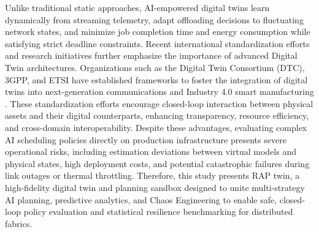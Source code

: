 \documentclass[twoside,twocolumn,10pt]{article}
\begin{document}
Unlike traditional static approaches, AI-empowered digital twins learn dynamically from streaming telemetry, adapt offloading decisions to fluctuating network states, and minimize job completion time and energy consumption while satisfying strict deadline constraints.
Recent international standardization efforts and research initiatives further emphasize the importance of advanced Digital Twin architectures. Organizations such as the Digital Twin Consortium (DTC), 3GPP, and ETSI have established frameworks to foster the integration of digital twins into next-generation communications and Industry 4.0 smart manufacturing \cite{dtc2020, iso23247}. 
These standardization efforts encourage closed-loop interaction between physical assets and their digital counterparts, enhancing transparency, resource efficiency, and cross-domain interoperability.
Despite these advantages, evaluating complex AI scheduling policies directly on production infrastructure presents severe operational risks, including estimation deviations between virtual models and physical states, high deployment costs, and potential catastrophic failures during link outages or thermal throttling.
Therefore, this study presents RAP twin, a high-fidelity digital twin and planning sandbox designed to unite multi-strategy AI planning, predictive analytics, and Chaos Engineering to enable safe, closed-loop policy evaluation and statistical resilience benchmarking for distributed fabrics.
\end{document}
